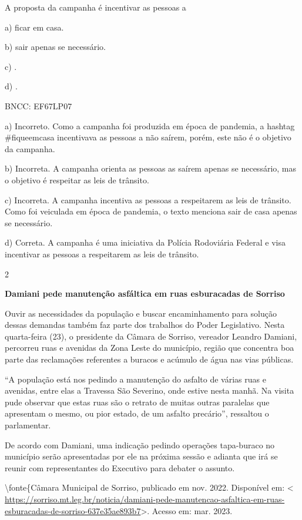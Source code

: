 {A proposta da campanha é incentivar as pessoas a

a) ficar em casa.

b) sair apenas se necessário.

c) .

d) .

BNCC: EF67LP07

a) Incorreto. Como a campanha foi produzida em época de pandemia, a
hashtag \#fiqueemcasa incentivava as pessoas a não saírem, porém, este
não é o objetivo da campanha.

b) Incorreta. A campanha orienta as pessoas as saírem apenas se
necessário, mas o objetivo é respeitar as leis de trânsito.

c) Incorreta. A campanha incentiva as pessoas a respeitarem as leis de
trânsito. Como foi veiculada em época de pandemia, o texto menciona sair
de casa apenas se necessário.

d) Correta. A campanha é uma iniciativa da Polícia Rodoviária Federal e
visa incentivar as pessoas a respeitarem as leis de trânsito.

\num{2}

\textbf{Damiani pede manutenção asfáltica em ruas esburacadas de
Sorriso}

Ouvir as necessidades da população e buscar encaminhamento para solução
dessas demandas também faz parte dos trabalhos do Poder Legislativo.
Nesta quarta-feira (23), o presidente da Câmara de Sorriso, vereador
Leandro Damiani, percorreu ruas e avenidas da Zona Leste do município,
região que concentra boa parte das reclamações referentes a buracos e
acúmulo de água nas vias públicas.

``A população está nos pedindo a manutenção do asfalto de várias ruas e
avenidas, entre elas a Travessa São Severino, onde estive nesta manhã.
Na visita pude observar que estas ruas são o retrato de muitas outras
paralelas que apresentam o mesmo, ou pior estado, de um asfalto
precário'', ressaltou o parlamentar.

De acordo com Damiani, uma indicação pedindo operações tapa-buraco no
município serão apresentadas por ele na próxima sessão e adianta que irá
se reunir com representantes do Executivo para debater o assunto.

\textbackslash fonte\{Câmara Municipal de Sorriso, publicado em nov.
2022. Disponível em: \textless{}
\url{https://sorriso.mt.leg.br/noticia/damiani-pede-manutencao-asfaltica-em-ruas-esburacadas-de-sorriso-637e35ae893b7}\textgreater.
Acesso em: mar. 2023.

}

